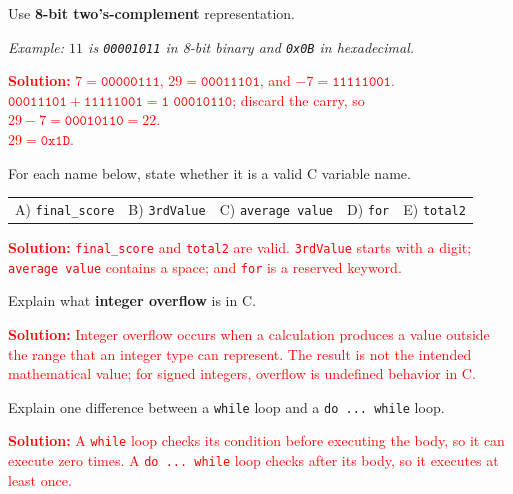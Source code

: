 \documentclass[12pt,a4paper,addpoints]{exam}
\newcommand{\answertext}[1]{%
  \ifprintanswers\par\noindent\textcolor{red}{\textbf{Solution:} #1}\par\fi}
\newcommand{\studentspace}[1]{\ifprintanswers\else\vspace{#1}\fi}
\begin{document}
\begin{questions}
\question[10] Use \textbf{8-bit two's-complement} representation.
\noindent\textit{Example: $11$ is \texttt{00001011} in 8-bit binary and \texttt{0x0B} in hexadecimal.}
\studentspace{3.2cm}
\answertext{$7=\texttt{00000111}$, $29=\texttt{00011101}$, and $-7=\texttt{11111001}$.\\
$\texttt{00011101}+\texttt{11111001}=\texttt{1 00010110}$; discard the carry, so $29-7=\texttt{00010110}=22$.\\
$29=\texttt{0x1D}$.}
\newpage
\question[10] For each name below, state whether it is a valid C variable name.
\begin{center}
\begin{tabular}{lllll}
A) \texttt{final\_score} & B) \texttt{3rdValue} & C) \texttt{average value} & D) \texttt{for} & E) \texttt{total2}
\end{tabular}
\end{center}
\studentspace{2.5cm}
\answertext{\texttt{final\_score} and \texttt{total2} are valid. \texttt{3rdValue} starts with a digit; \texttt{average value} contains a space; and \texttt{for} is a reserved keyword.}

\question[5] Explain what \textbf{integer overflow} is in C.
\studentspace{1.5cm}
\answertext{Integer overflow occurs when a calculation produces a value outside the range that an integer type can represent. The result is not the intended mathematical value; for signed integers, overflow is undefined behavior in C.}

\question[5] Explain one difference between a \texttt{while} loop and a \texttt{do ... while} loop.
\studentspace{1.5cm}
\answertext{A \texttt{while} loop checks its condition before executing the body, so it can execute zero times. A \texttt{do ... while} loop checks after its body, so it executes at least once.}


\end{questions}
\end{document}

